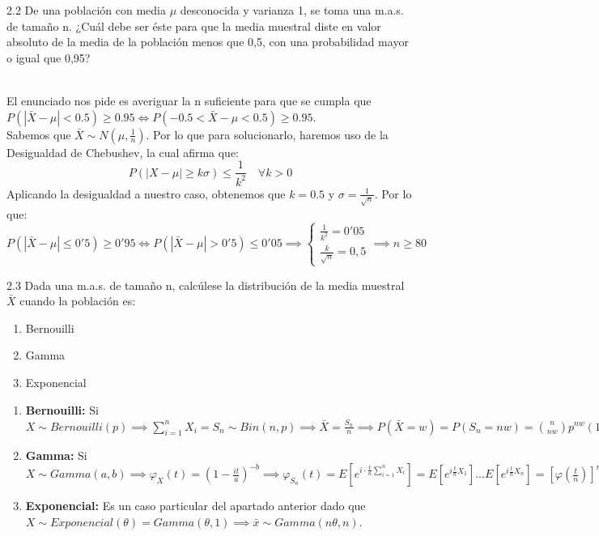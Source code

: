 \begin{problem}{2.2}
De una población con media $\mu$ desconocida y varianza 1, se toma una m.a.s. de tamaño n. ¿Cuál debe ser éste para que la media muestral diste en valor absoluto de la media de la población menos que 0,5, con una probabilidad mayor o igual que 0,95?
\end{problem}
\begin{sol}
	\\El enunciado nos pide es averiguar la n suficiente para que se cumpla que $P(|\bar{X}-\mu|<0.5)\geq 0.95 \iff P( -0.5 < \bar{X} - \mu < 0.5) \geq 0.95$.\\
	Sabemos que $\bar{X} \sim N(\mu, \frac{1}{n})$. Por lo que
	para solucionarlo, haremos uso de la Desigualdad de Chebushev, la cual afirma que: $$ P(|X - \mu| \geq k\sigma) \leq \frac{1}{k^2} \quad \forall k > 0$$
	Aplicando la desigualdad a nuestro caso, obtenemos que $k = 0.5$ y $\sigma = \frac{1}{\sqrt{n}}$. Por lo que:
	$$P(|\bar{X} - \mu| \leq 0'5) \geq 0'95 \iff P(|\bar{X} - \mu| > 0'5) \leq 0'05 \implies \begin{cases} \frac{1}{k^2} = 0'05 \\ \frac{k}{\sqrt{n}} = 0,5 \end{cases} \implies n \geq 80$$
\end{sol}
\begin{problem}{2.3}
Dada una m.a.s. de tamaño n, calcúlese la distribución de la media muestral $\bar{X}$ cuando la población es:
\begin{enumerate}
	\item Bernouilli
	\item Gamma
	\item Exponencial
\end{enumerate}
\end{problem}
\begin{sol}
	\begin{enumerate}
		\item \textbf{Bernouilli:} Si $X \sim Bernouilli(p) \implies \sum_{i = 1}^{n}X_i = S_n \sim Bin(n, p) \implies \bar{X} = \frac{S_n}{n} \implies P(\bar{X} = w) = P(S_n = nw) = \binom{n}{nw}p^{nw}(1-p)^{n(1-w)}$
		\item \textbf{Gamma:} Si $X \sim Gamma(a, b) \implies \varphi_{X}(t) = (1 - \frac{it}{a})^{-b} \implies \varphi_{S_n}(t) = E[e^{i \cdot \frac{t}{n}\sum_{i = 1}^{n}X_i}] = E[e^{i\frac{t}{n}X_1}] \ldots E[e^{i\frac{t}{n}X_n}] = \left[\varphi(\frac{t}{n})\right]^n = (1- \frac{it}{an})^{-nb} \implies \bar{X} \sim Gamma(na,nb)$
		\item \textbf{Exponencial:} Es un caso particular del apartado anterior dado que $X \sim Exponencial(\theta) = Gamma(\theta, 1) \implies \bar{x} \sim Gamma(n\theta, n)$.
	\end{enumerate}
\end{sol}
